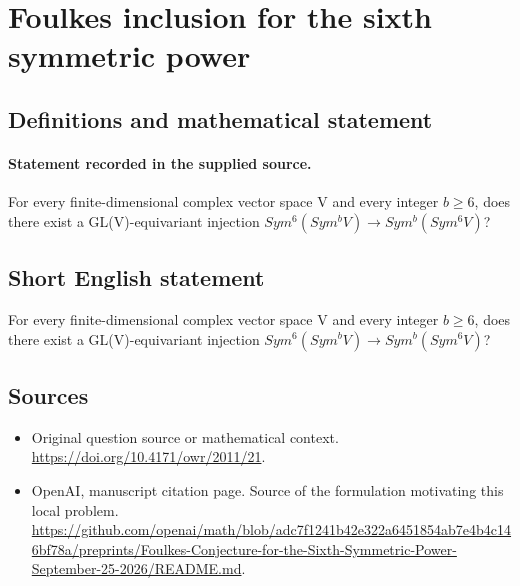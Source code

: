 \documentclass[11pt]{article}
\begin{document}
\section*{Foulkes inclusion for the sixth symmetric power}\label{30006996}
\subsection{Definitions and mathematical statement}
\paragraph{Statement recorded in the supplied source.}
For every finite-dimensional complex vector space V and every integer $b\geq 6$, does there exist a GL(V)-equivariant injection $Sym^{6}(Sym^{b}V)\to Sym^{b}(Sym^{6}V)$?
\subsection{Short English statement}
For every finite-dimensional complex vector space V and every integer $b\geq 6$, does there exist a GL(V)-equivariant injection $Sym^{6}(Sym^{b}V)\to Sym^{b}(Sym^{6}V)$?
\subsection{Sources}
\begin{itemize}
\item[S1] Original question source or mathematical context.
\url{https://doi.org/10.4171/owr/2011/21}.
\item[S2] OpenAI, manuscript citation page. Source of the formulation motivating this local problem.
\url{https://github.com/openai/math/blob/adc7f1241b42e322a6451854ab7e4b4c146bf78a/preprints/Foulkes-Conjecture-for-the-Sixth-Symmetric-Power-September-25-2026/README.md}.
\end{itemize}
\end{document}

